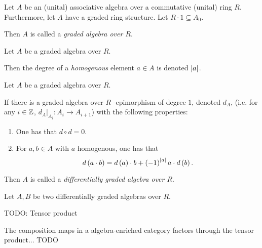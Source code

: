 \begin{definition}
    Let \( A \) be an (unital) associative algebra over a commutative (unital) ring \( R \). Furthermore, let \( A \) have a graded ring structure. Let \( R \cdot 1 \subseteq A_0 \).

    Then \( A \) is called a \emph{graded algebra over \( R \)}.
\end{definition}

\begin{notation}
    Let \( A \) be a graded algebra over \( R \).

    Then the degree of a \emph{homogenous} element \( a \in A \) is denoted \emph{\( \lvert a \rvert \)}.
\end{notation}

\begin{definition}
    Let \( A \) be a graded algebra over \( R \).

    If there is a graded algebra over \( R \) -epimorphism of degree \( 1 \), denoted \( d_A \), (i.e. for any \( i \in {\mathbb{Z}} \), \( d_A |_{A_i}: A_i \to A_{i + 1} \))
    with the following properties:
    \begin{enumerate}
        \item One has that \( d \circ d = 0 \).
        \item {
            For \( a, b \in A \) with \( a \) homogenous, one has that
            \[
                d\left( a \cdot b \right)
                =
                d\left( a \right) \cdot b + \left( -1 \right)^{\lvert a \rvert}a \cdot d\left( b \right).
            \]
            }
    \end{enumerate}

    Then \( A \) is called a \emph{differentially graded algebra over \( R \)}.
\end{definition}

\begin{definition}
    Let \( A, B \) be two differentially graded algebras over \( R \).

    TODO: Tensor product
\end{definition}

\begin{remark}
    The composition maps in a algebra-enriched category factors through the tensor product... TODO
\end{remark}

